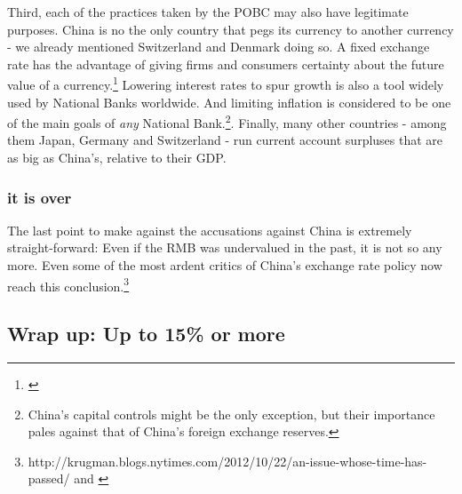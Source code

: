 Third, each of the practices taken by the POBC may also have legitimate purposes. China is no the only country that pegs its currency to another currency - we already mentioned Switzerland and Denmark doing so. A fixed exchange rate has the advantage of giving firms and consumers certainty about the future value of a currency.\footnote{\cite[p. 515]{Krugman2008}} Lowering interest rates to spur growth is also a tool widely used by National Banks worldwide. And limiting inflation is considered to be one of the main goals of \emph{any} National Bank.\footnote{China's capital controls might be the only exception, but their importance pales against that of China's foreign exchange reserves.}. Finally, many other countries - among them Japan, Germany and Switzerland - run current account surpluses that are as big as China's, relative to their GDP.


\subsubsection{it is over}

The last point to make against the accusations against China is extremely straight-forward: Even if the RMB was undervalued in the past, it is not so any more. Even some of the most ardent critics of China's exchange rate policy now reach this conclusion.\footnote{\cite{Krugman2012}http://krugman.blogs.nytimes.com/2012/10/22/an-issue-whose-time-has-passed/ and \cite{ClineWilliamson2012}} %



\subsection{Wrap up: Up to 15\% or more}



%


